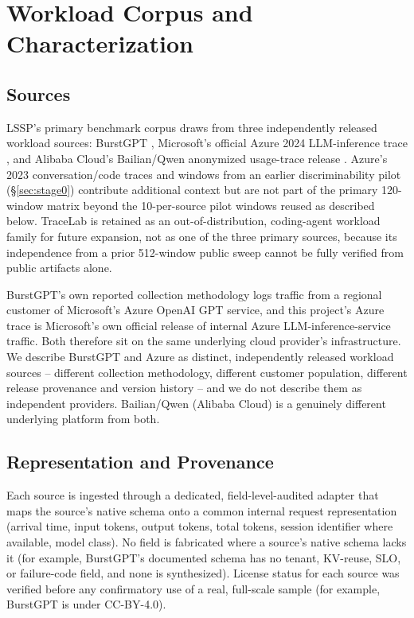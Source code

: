 \section{Workload Corpus and Characterization}
\label{sec:workloads}

\subsection{Sources}
\label{sec:sources}

LSSP's primary benchmark corpus draws from three independently released
workload sources: BurstGPT \citep{burstgpt2025}, Microsoft's official Azure
2024 LLM-inference trace \citep{azure2024trace,stojkovic2025dynamollm}, and
Alibaba Cloud's Bailian/Qwen anonymized usage-trace
release \citep{bailianqwen2026}. Azure's 2023 conversation/code traces
\citep{patel2024splitwise} and windows from an earlier discriminability
pilot (\S\ref{sec:stage0}) contribute additional context but are not part
of the primary 120-window matrix beyond the 10-per-source pilot windows
reused as described below. TraceLab \citep{tracelab2026} is retained as an
out-of-distribution, coding-agent workload family for future expansion,
not as one of the three primary sources, because its independence from a
prior 512-window public sweep cannot be fully verified from public
artifacts alone.

BurstGPT's own reported
collection methodology logs traffic from a regional customer of Microsoft's
Azure OpenAI GPT service, and this project's Azure trace is Microsoft's own
official release of internal Azure LLM-inference-service traffic. Both
therefore sit on the same underlying cloud provider's infrastructure. We
describe BurstGPT and Azure as distinct, independently released workload
sources -- different collection methodology, different customer
population, different release provenance and version history -- and we do
not describe them as independent providers. Bailian/Qwen (Alibaba Cloud)
is a genuinely different underlying platform from both.

\subsection{Representation and Provenance}
\label{sec:provenance}

Each source is ingested through a dedicated, field-level-audited adapter that maps the source's native
schema onto a common internal request representation (arrival time, input
tokens, output tokens, total tokens, session identifier where available,
model class). No field is fabricated where a source's native schema lacks
it (for example, BurstGPT's documented schema has no tenant, KV-reuse, SLO,
or failure-code field, and none is synthesized). License status for each source was verified before any confirmatory use of a real, full-scale sample (for example, BurstGPT is under CC-BY-4.0).

